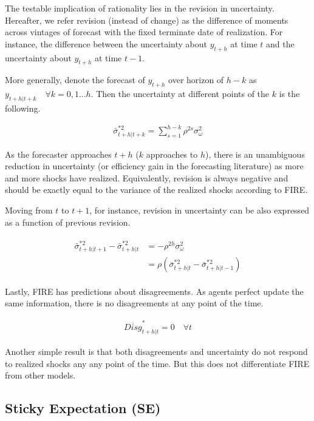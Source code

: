 \documentclass[]{article}
\begin{document}
	The testable implication of rationality lies in the revision in uncertainty. Hereafter, we refer revision (instead of change) as the difference of moments across vintages of forecast with the fixed terminate date of realization. For instance, the difference between the uncertainty about $y_{t+h}$ at time $t$ and the uncertainty about $y_{t+h}$ at time $t-1$.
	
	More generally,  denote the forecast of $y_{t+h}$ over horizon of $h-k$ as $y_{t+h|t+k} \quad \forall k =0,1...h$. Then the uncertainty at different points of the $k$ is the following. 
	
	\begin{eqnarray}\label{VarREPop}
		\bar \sigma^{*2}_{t+h|t+k} = \sum^{h-k}_{s=1}\rho^{2s} \sigma^2_{\omega}
	\end{eqnarray}
	
	As the forecaster approaches $t+h$ ($k$ approaches to $h$), there is an unambiguous reduction in uncertainty (or efficiency gain in the forecasting literature) as more and more shocks have realized. Equivalently, revision is always negative and should be exactly equal to the variance of the realized shocks according to FIRE. 
	
	Moving from $t$ to $t+1$, for instance, revision in uncertainty can be also expressed as a function of previous revision.  
	
	\begin{eqnarray}\label{VarREPopRv}
		\begin{aligned}
			\bar \sigma^{*2}_{t+h|t+1} - \bar \sigma^{*2}_{t+h|t} & = - \rho^{2h}\sigma^2_\omega \\
			& =  \rho (\bar \sigma^{*2}_{t+h|t} - \bar \sigma^{*2}_{t+h|t-1})
		\end{aligned}
	\end{eqnarray}
	
	Lastly, FIRE has predictions about disagreements. As agents perfect update the same information, there is no disagreements at any point of the time. 
	
	\begin{eqnarray}\label{DisgREPop}
		\overline{Disg}^{*}_{t+h|t}=0 \quad \forall t
	\end{eqnarray}
	
	Another simple result is that both disagreements and uncertainty do not respond to realized shocks any any point of the time. But this does not differentiate FIRE from other models. 
	
	\subsection{Sticky Expectation (SE)}
	
\end{document}

